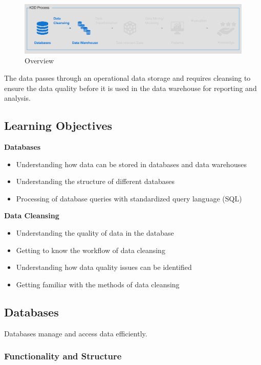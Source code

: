 \documentclass[12pt, a4paper, oneside, justified]{article}
\begin{document}
\begin{figure}[!h]
    \centering
    \includegraphics[scale=0.8]{../img/3-1.png}
    \caption{Overview}
    \label{img/3-1}
\end{figure}

The data passes through an operational data storage and requires cleansing to ensure the data quality before it is used in the data warehouse for reporting and analysis.

\subsection{Learning Objectives}

\textbf{Databases}

\begin{itemize}
    \item Understanding how data can be stored in databases and data warehouses
    \item Understanding the structure of different databases
    \item Processing of database queries with standardized query language (SQL)
\end{itemize}

\textbf{Data Cleansing}

\begin{itemize}
    \item Understanding the quality of data in the database
    \item Getting to know the workflow of data cleansing
    \item Understanding how data quality issues can be identified
    \item Getting familiar with the methods of data cleansing
\end{itemize}

\subsection{Databases}

Databases manage and access data efficiently.

\subsubsection{Functionality and Structure}
\end{document}
